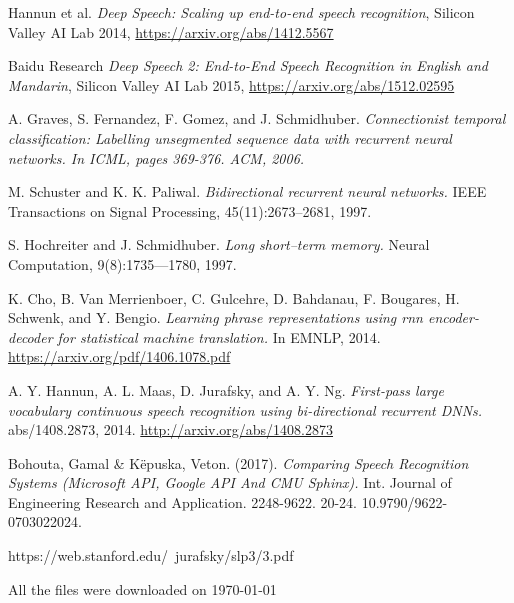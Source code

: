 \documentclass[licencjacka,en]{pracamgr}
\newcommand{\bibDownloadDate}{\today}
\begin{document}
\begin{thebibliography}{99}

 Hannun et al. 
\textit{Deep Speech: Scaling up end-to-end speech recognition}, Silicon Valley AI Lab 2014, \href{https://arxiv.org/abs/1412.5567}{https://arxiv.org/abs/1412.5567}
  
 Baidu Research \textit{Deep Speech 2: End-to-End Speech Recognition in English and Mandarin}, Silicon Valley AI Lab 2015, \href{https://arxiv.org/abs/1512.02595}{https://arxiv.org/abs/1512.02595}

 A. Graves, S. Fernandez, F. Gomez, and J. Schmidhuber. \textit{Connectionist temporal classification:
Labelling unsegmented sequence data with recurrent neural networks. In ICML, pages 369-376. ACM, 2006.}

 M. Schuster and K. K. Paliwal. \textit{Bidirectional recurrent neural networks.} IEEE Transactions on Signal Processing, 45(11):2673–2681, 1997.

 S. Hochreiter and J. Schmidhuber. \textit{Long short--term memory.} Neural Computation, 9(8):1735—1780, 1997.

 K. Cho, B. Van Merrienboer, C. Gulcehre, D. Bahdanau, F. Bougares, H. Schwenk, and Y. Bengio. \textit{Learning phrase representations using rnn encoder-decoder for statistical machine translation.} In EMNLP, 2014. \href{https://arxiv.org/pdf/1406.1078.pdf}{https://arxiv.org/pdf/1406.1078.pdf}

 A. Y. Hannun, A. L. Maas, D. Jurafsky, and A. Y. Ng. \textit{First-pass large vocabulary continuous speech recognition using bi-directional recurrent DNNs.} abs/1408.2873, 2014. \href{http://arxiv.org/abs/1408.2873}{http://arxiv.org/abs/1408.2873}

 Bohouta, Gamal \& Këpuska, Veton. (2017). \textit{Comparing Speech Recognition Systems (Microsoft API, Google API And CMU Sphinx).} Int. Journal of Engineering Research and Application. 2248-9622. 20-24. 10.9790/9622-0703022024.

 https://web.stanford.edu/~jurafsky/slp3/3.pdf

\end{thebibliography}
All the files were downloaded on \bibDownloadDate
\end{document}
